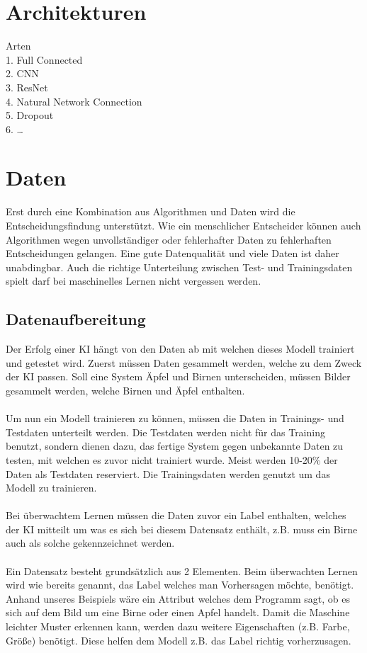 \documentclass[12pt,oneside,a4paper,parskip]{scrbook}
\begin{document}
\section{Architekturen}
Arten
\\1.	Full Connected
\\2.	CNN
\\3.	ResNet
\\4.	Natural Network Connection
\\5.	Dropout
\\6.	…

\section{Daten}
\label{section:Data}
Erst durch eine Kombination aus Algorithmen und Daten wird die Entscheidungsfindung unterstützt. Wie ein menschlicher Entscheider können auch Algorithmen wegen unvollständiger oder fehlerhafter Daten zu fehlerhaften Entscheidungen gelangen. Eine gute Datenqualität und viele Daten ist daher unabdingbar. Auch die richtige Unterteilung zwischen Test- und Trainingsdaten spielt darf bei maschinelles Lernen nicht vergessen werden.

\subsection{Datenaufbereitung}
\label{section:dataSetup}
Der Erfolg einer KI hängt von den Daten ab mit welchen dieses Modell trainiert und getestet wird. Zuerst müssen Daten gesammelt werden, welche zu dem Zweck der KI passen. Soll eine System Äpfel und Birnen unterscheiden, müssen Bilder gesammelt werden, welche Birnen und Äpfel enthalten.
\\\\
Um nun ein Modell trainieren zu können, müssen die Daten in Trainings- und Testdaten unterteilt werden. Die Testdaten werden nicht für das Training benutzt, sondern dienen dazu, das fertige System gegen unbekannte Daten zu testen, mit welchen es zuvor nicht trainiert wurde. Meist werden 10-20\% der Daten als Testdaten reserviert. Die Trainingsdaten werden genutzt um das Modell zu trainieren.
\\\\
Bei überwachtem Lernen müssen die Daten zuvor ein Label enthalten, welches der KI mitteilt um was es sich bei diesem Datensatz enthält, z.B. muss ein Birne auch als solche gekennzeichnet werden.
\\\\
Ein Datensatz besteht grundsätzlich aus 2 Elementen. Beim überwachten Lernen wird wie bereits genannt, das Label welches man Vorhersagen möchte, benötigt. Anhand unseres Beispiels wäre ein Attribut welches dem Programm sagt, ob es sich auf dem Bild um eine Birne oder einen Apfel handelt. Damit die Maschine leichter Muster erkennen kann, werden dazu weitere Eigenschaften (z.B. Farbe, Größe) benötigt. Diese helfen dem Modell z.B. das Label richtig vorherzusagen.
\end{document}
